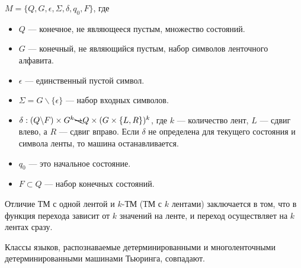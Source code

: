     \begin{Def}
        $M = \{Q, G, \epsilon, \Sigma, \delta, q_0, F\}$, где
        \begin{itemize}
            \item $Q$ --- конечное, не являющееся пустым, множество состояний.
            \item $G$ --- конечный, не являющийся пустым, набор символов ленточного алфавита.
            \item $\epsilon$ --- единственный пустой символ.
            \item $\Sigma = G \backslash \{\epsilon\}$ --- набор входных символов.
            \item $\delta : (Q \backslash F) \times G^k \bcancel{\rightarrow}
            Q \times (G \times \{L, R\})^k$, где $k$ --- количество лент, $L$ --- сдвиг влево, а $R$ --- сдвиг вправо. Если $\delta$ не определена для текущего состояния и символа ленты, то машина останавливается.
            \item $q_0$ --- это начальное состояние.
            \item $F \subset {Q}$  --- набор конечных состояний.
        \end{itemize}
    \end{Def}
    
    \begin{Rem}
        Отличие ТМ с одной лентой и $k$-ТМ (ТМ с $k$ лентами) заключается в том, что в функция перехода зависит от $k$ значений на ленте, и переход осуществляет на $k$ лентах сразу.
    \end{Rem}


    \begin{Thm}
        Классы языков, распознаваемые детерминированными и многоленточными детерминированными машинами Тьюринга, совпадают.
    \end{Thm}
    
